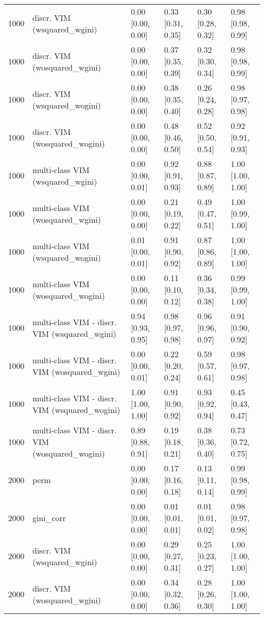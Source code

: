 \begin{table}[ht]
\begin{tabular}{rlllll}
  1000 & discr. VIM (wsquared\_wgini) & 0.00 [0.00, 0.00] & 0.33 [0.31, 0.35] & 0.30 [0.28, 0.32] & 0.98 [0.98, 0.99] \\ 
  1000 & discr. VIM (wosquared\_wgini) & 0.00 [0.00, 0.00] & 0.37 [0.35, 0.39] & 0.32 [0.30, 0.34] & 0.98 [0.98, 0.99] \\ 
  1000 & discr. VIM (wsquared\_wogini) & 0.00 [0.00, 0.00] & 0.38 [0.35, 0.40] & 0.26 [0.24, 0.28] & 0.98 [0.97, 0.98] \\ 
  1000 & discr. VIM (wosquared\_wogini) & 0.00 [0.00, 0.00] & 0.48 [0.46, 0.50] & 0.52 [0.50, 0.54] & 0.92 [0.91, 0.93] \\ 
  1000 & multi-class VIM (wsquared\_wgini) & 0.00 [0.00, 0.01] & 0.92 [0.91, 0.93] & 0.88 [0.87, 0.89] & 1.00 [1.00, 1.00] \\ 
  1000 & multi-class VIM (wosquared\_wgini) & 0.00 [0.00, 0.00] & 0.21 [0.19, 0.22] & 0.49 [0.47, 0.51] & 1.00 [0.99, 1.00] \\ 
  1000 & multi-class VIM (wsquared\_wogini) & 0.01 [0.00, 0.01] & 0.91 [0.90, 0.92] & 0.87 [0.86, 0.89] & 1.00 [1.00, 1.00] \\ 
  1000 & multi-class VIM (wosquared\_wogini) & 0.00 [0.00, 0.00] & 0.11 [0.10, 0.12] & 0.36 [0.34, 0.38] & 0.99 [0.99, 1.00] \\ 
  1000 & multi-class VIM - discr. VIM (wsquared\_wgini) & 0.94 [0.93, 0.95] & 0.98 [0.97, 0.98] & 0.96 [0.96, 0.97] & 0.91 [0.90, 0.92] \\ 
  1000 & multi-class VIM - discr. VIM (wosquared\_wgini) & 0.00 [0.00, 0.01] & 0.22 [0.20, 0.24] & 0.59 [0.57, 0.61] & 0.98 [0.97, 0.98] \\ 
  1000 & multi-class VIM - discr. VIM (wsquared\_wogini) & 1.00 [1.00, 1.00] & 0.91 [0.90, 0.92] & 0.93 [0.92, 0.94] & 0.45 [0.43, 0.47] \\ 
  1000 & multi-class VIM - discr. VIM (wosquared\_wogini) & 0.89 [0.88, 0.91] & 0.19 [0.18, 0.21] & 0.38 [0.36, 0.40] & 0.73 [0.72, 0.75] \\ 
   \hline 2000 & perm & 0.00 [0.00, 0.00] & 0.17 [0.16, 0.18] & 0.13 [0.11, 0.14] & 0.99 [0.98, 0.99] \\ 
  2000 & gini\_corr & 0.00 [0.00, 0.00] & 0.01 [0.01, 0.01] & 0.01 [0.01, 0.02] & 0.98 [0.97, 0.98] \\ 
  2000 & discr. VIM (wsquared\_wgini) & 0.00 [0.00, 0.00] & 0.29 [0.27, 0.31] & 0.25 [0.23, 0.27] & 1.00 [1.00, 1.00] \\ 
  2000 & discr. VIM (wosquared\_wgini) & 0.00 [0.00, 0.00] & 0.34 [0.32, 0.36] & 0.28 [0.26, 0.30] & 1.00 [1.00, 1.00] \\ 

\end{tabular}
\end{table}
